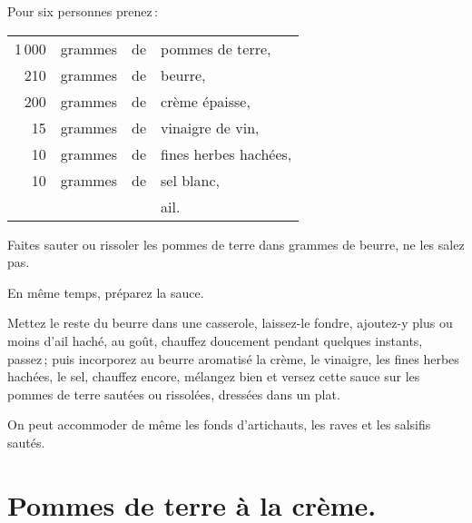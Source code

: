 Pour six personnes prenez :

\footnotesize
\begin{longtable}{rrrp{16em}}
  1 000 & grammes & de & pommes de terre,                                                                 \\
    210 & grammes & de & beurre,                                                                          \\
    200 & grammes & de & crème épaisse,                                                                   \\
     15 & grammes & de & vinaigre de vin,                                                                 \\
     10 & grammes & de & fines herbes hachées,                                                            \\
     10 & grammes & de & sel blanc,                                                                       \\
        &         &    & ail.                                                                             \\
\end{longtable}
\normalsize

Faites sauter ou rissoler les pommes de terre dans {\mmm} grammes de
beurre, ne les salez pas.

En même temps, préparez la sauce.

Mettez le reste du beurre dans une casserole, laissez-le fondre, ajoutez-y plus
ou moins d'ail haché, au goût, chauffez doucement pendant quelques instants,
passez ; puis incorporez au beurre aromatisé la crème, le vinaigre, les fines
herbes hachées, le sel, chauffez encore, mélangez bien et versez cette sauce
sur les pommes de terre sautées ou rissolées, dressées dans un plat.

\sk

On peut accommoder de même les fonds d'artichauts, les raves et les salsifis
sautés.

\section*{\centering Pommes de terre à la crème.}
{}

